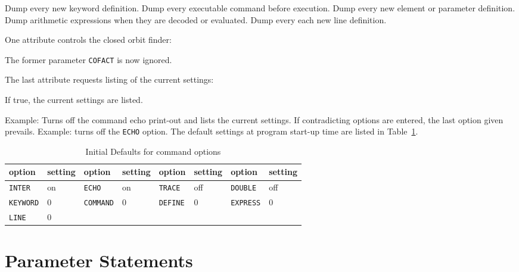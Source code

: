 \begin{mylist}
Dump every new keyword definition.
Dump every executable command before execution.
Dump every new element or parameter definition.
Dump arithmetic expressions when they are decoded or evaluated.
Dump every each new line definition.
\end{mylist}
One attribute controls the closed orbit finder:
\begin{mylist}
The former parameter {\tt COFACT} is now ignored.
\end{mylist}
The last attribute requests listing of the current settings:
\begin{mylist}
If true, the current settings are listed.
\end{mylist}
Example:
Turns off the command echo print-out and lists the current settings.
If contradicting options are entered, the last option given prevails.
Example:
turns off the {\tt ECHO} option.
The default settings at program start-up time are listed in
Table~\ref{T-OPT}.
\begin{table}[ht]
\caption{Initial Defaults for command options}
\vspace{1ex}
\label{T-OPT}
\centering
\begin{tabular}{|l|l||l|l||l|l||l|l|}
\hline
option &setting &option &setting &option &setting &option &setting \\
\hline
{\tt INTER}  &on &{\tt ECHO}   &on & {\tt TRACE} &off &{\tt DOUBLE} &off \\
{\tt KEYWORD}&0  &{\tt COMMAND}&0  & {\tt DEFINE}&0   &{\tt EXPRESS}&0 \\
{\tt LINE}   &0  &             &   &             &    &             & \\
\hline
\end{tabular}
\end{table}
 
\section{Parameter Statements}
 
